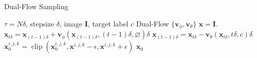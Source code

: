 \begin{algorithm}[tb]
   \caption{Dual-Flow Sampling}
   \label{alg:sampling}
\begin{algorithmic}
    $\tau = N\delta$, stepsize $\delta$, image $\mathbf{I}$,  target label $c$ Dual-Flow $\{\mathbf{v}_\phi, \mathbf{v}_\theta \}$
   \STATE $\mathbf{x}=\mathbf{I}$.
   \STATE $\mathbf{x}_{t\delta} = \mathbf{x}_{(t-1)\delta} + \mathbf{v}_\phi(\mathbf{x}_{(t-1)\delta}, (t-1)\delta, \varnothing) \delta$
   \ENDFOR
   \STATE $\mathbf{x}_{(t-1)\delta} = \mathbf{x}_{t\delta} - \mathbf{v}_\theta(\mathbf{x}_{t\delta}, t\delta, c) \delta$
   \ENDFOR
   \STATE $\mathbf{x}_0^{i,j,k} = \operatorname{clip}\left( \mathbf{x}_0^{i,j,k}, \mathbf{x}^{i,j,k} - \epsilon, \mathbf{x}^{i,j,k} + \epsilon \right)$
    $\mathbf{x}_0$
\end{algorithmic}
\end{algorithm}

